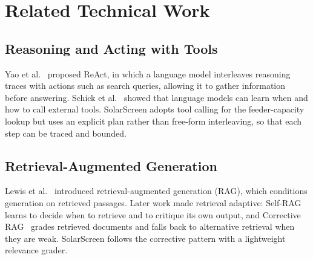 \documentclass[12pt,a4paper,oneside]{report}
\newif\ifguidance
\newcommand{\guide}[1]{%
  \ifguidance
  \begin{tcolorbox}[enhanced,breakable,colback=guidebg,colframe=bmsblue,
    boxrule=0.6pt,arc=2pt,left=6pt,right=6pt,top=4pt,bottom=4pt,
    fonttitle=\bfseries\small,title={What to write here},
    before upper={\small\setstretch{1.1}}]
  #1
  \end{tcolorbox}
  \fi}
\newcommand{\dodont}[2]{%
  \ifguidance
  \begin{tcolorbox}[enhanced,breakable,sidebyside,sidebyside align=top seam,
    colback=dobg,colbacklower=dontbg,colframe=gray!60,boxrule=0.5pt,arc=2pt,
    lefthand ratio=0.5,left=5pt,right=5pt,top=4pt,bottom=4pt,
    fontupper=\small\setstretch{1.05},fontlower=\small\setstretch{1.05}]
  \textbf{\textcolor{ForestGreen}{\checkmark\ Do}}
  \begin{itemize}[leftmargin=12pt,itemsep=1pt,topsep=2pt]#1\end{itemize}
  \tcblower
  \textbf{\textcolor{BrickRed}{$\times$ Don't}}
  \begin{itemize}[leftmargin=12pt,itemsep=1pt,topsep=2pt]#2\end{itemize}
  \end{tcolorbox}
  \fi}
\newenvironment{sample}
  {\par\noindent{\footnotesize\bfseries\textcolor{BrickRed}{[SAMPLE --- replace with your own content]}}\par\color{samplecol}}
  {\par\medskip}
\begin{document}
\section{Related Technical Work}
\guide{Organise the literature by theme, not paper by paper. Typical themes for this course are
tool-using language models, retrieval-augmented generation, planning and reflection, multi-agent
systems, and evaluation of LLM output. For each theme, summarise the key idea and how it relates to
your project.}
\dodont{\item Group papers by theme and compare them.
\item Say how each work relates to your design.
\item Paraphrase in your own words and cite.
}
{\item Do not write one paragraph per paper with no comparison.
\item Do not copy abstracts.
\item Do not cite papers you have not read.
}

\subsection{Reasoning and Acting with Tools}
\begin{sample}
Yao et al.~\cite{yao2023react} proposed ReAct, in which a language model interleaves reasoning traces
with actions such as search queries, allowing it to gather information before answering. Schick et
al.~\cite{schick2023toolformer} showed that language models can learn when and how to call external
tools. SolarScreen adopts tool calling for the feeder-capacity lookup but uses an explicit plan rather
than free-form interleaving, so that each step can be traced and bounded.
\end{sample}

\subsection{Retrieval-Augmented Generation}
\begin{sample}
Lewis et al.~\cite{lewis2020rag} introduced retrieval-augmented generation (RAG), which conditions
generation on retrieved passages. Later work made retrieval adaptive: Self-RAG~\cite{asai2024selfrag}
learns to decide when to retrieve and to critique its own output, and Corrective RAG~\cite{yan2024crag}
grades retrieved documents and falls back to alternative retrieval when they are weak. SolarScreen
follows the corrective pattern with a lightweight relevance grader.
\end{sample}
\end{document}
